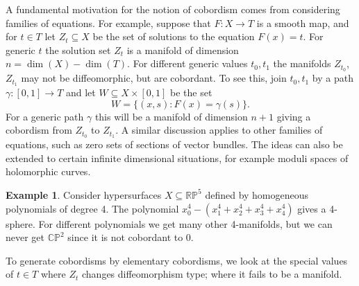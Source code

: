 \documentclass{article}
\theoremstyle{definition}
\newtheorem*{example}{Example}
\newcommand{\RP}{\mathbb{RP}}
\newcommand{\CP}{\mathbb{CP}}
\begin{document}
A fundamental motivation for the notion of cobordism comes from considering
families of equations. For example, suppose that $F:X\to T$ is a smooth map, and
for $t\in T$ let $Z_t\subseteq X$ be the set of solutions to the equation
$F(x)=t$. For generic $t$ the solution set $Z_t$ is a manifold of dimension
$n=\dim(X)-\dim(T)$. For different generic values $t_0,t_1$ the manifolds
$Z_{t_0}$, $Z_{t_1}$ may not be diffeomorphic, but are cobordant. To see this,
join $t_0,t_1$ by a path $\gamma:[0,1]\to T$ and let $W\subseteq X\times[0,1]$
be the set
\begin{equation*}
    W = \{(x,s):F(x)=\gamma(s)\}.
\end{equation*}
For a generic path $\gamma$ this will be a manifold of dimension $n+1$ giving a
cobordism from $Z_{t_0}$ to $Z_{t_1}$. A similar discussion applies to other
families of equations, such as zero sets of sections of vector bundles. The
ideas can also be extended to certain infinite dimensional situations, for
example moduli spaces of holomorphic curves.

\begin{example}
    Consider hypersurfaces $X\subseteq\RP^5$ defined by homogeneous polynomials
    of degree 4. The polynomial $x_0^4-(x_1^4+x_2^4+x_3^4+x_4^4)$ gives a
    4-sphere. For different polynomials we get many other 4-manifolds, but we
    can never get $\CP^2$ since it is not cobordant to 0.
\end{example}

To generate cobordisms by elementary cobordisms, we look at the special values
of $t\in T$ where $Z_t$ changes diffeomorphism type; where it fails to be a
manifold.
\end{document}
